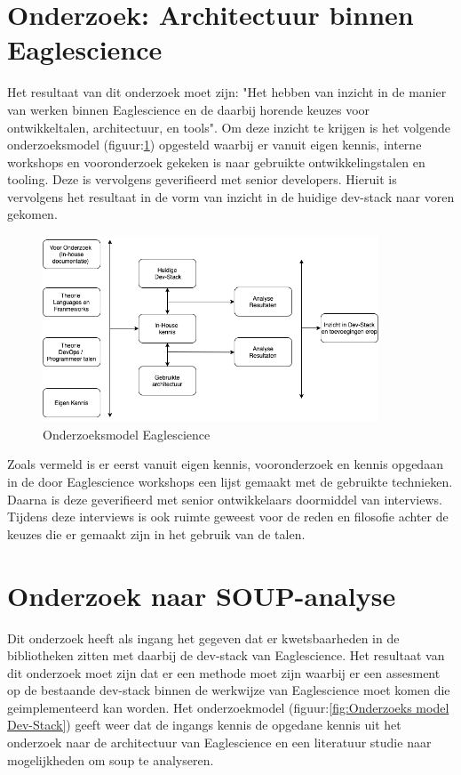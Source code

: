 \section{Onderzoek: Architectuur binnen Eaglescience}\label{sec:onderzoeksmethode-architectuur-binnen-eaglescience}
Het resultaat van dit onderzoek moet zijn: "Het hebben van inzicht in de manier van werken binnen Eaglescience en de daarbij horende keuzes voor ontwikkeltalen, architectuur, en tools".
Om deze inzicht te krijgen is het volgende onderzoeksmodel (figuur:\ref{fig:Onderzoeks model Eaglescience}) opgesteld waarbij er vanuit eigen kennis, interne workshops en vooronderzoek gekeken is naar gebruikte ontwikkelingstalen en tooling.
Deze is vervolgens geverifieerd met senior developers.
Hieruit is vervolgens het resultaat in de vorm van inzicht in de huidige dev-stack naar voren gekomen.
\begin{figure}[h!] %
  \myfloatalign
  \includegraphics[width=10cm]{gfx/OnderzoeksmodelES}
  \caption{Onderzoeksmodel Eaglescience}
  \label{fig:Onderzoeks model Eaglescience}
\end{figure}

Zoals vermeld is er eerst vanuit eigen kennis, vooronderzoek en kennis opgedaan in de door Eaglescience workshops een lijst gemaakt met de gebruikte technieken.
Daarna is deze geverifieerd met senior ontwikkelaars doormiddel van interviews.
Tijdens deze interviews is ook ruimte geweest voor de reden en filosofie achter de keuzes die er gemaakt zijn in het gebruik van de talen.

\section{Onderzoek naar SOUP-analyse}\label{sec:onderzoek-naar-soup-analyse}
Dit onderzoek heeft als ingang het gegeven dat er kwetsbaarheden in de bibliotheken zitten met daarbij de dev-stack van Eaglescience.
Het resultaat van dit onderzoek moet zijn dat er een methode moet zijn waarbij er een assesment op de bestaande dev-stack binnen de werkwijze van Eaglescience moet komen die geimplementeerd kan worden.
Het onderzoekmodel (figuur:\ref{fig:Onderzoeks model Dev-Stack}) geeft weer dat de ingangs kennis de opgedane kennis uit het onderzoek naar de architectuur van Eaglescience en een literatuur studie naar mogelijkheden om soup te analyseren.


